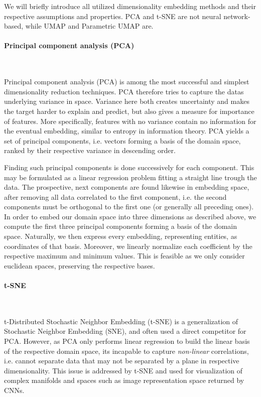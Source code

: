 \documentclass[]{article}
\renewcommand{\cite}{\citep}
\begin{document}
We will briefly introduce all utilized dimensionality embedding methods and their respective assumptions and properties. PCA and t-SNE are not neural network-based, while UMAP and Parametric UMAP are.

\paragraph{Principal component analysis (PCA)}\mbox{}\\
\label{sec:pca}


Principal component analysis (PCA) \cite{abdi2010principal, wold1987principal} is among the most successful and simplest dimensionality reduction techniques. PCA therefore tries to capture the datas underlying variance in space. Variance here both creates uncertainty and makes the target harder to explain and predict, but also gives a measure for importance of features. More specifically, features with no variance contain no information for the eventual embedding, similar to entropy in information theory. PCA yields a set of principal components, i.e. vectors forming a basis of the domain space, ranked by their respective variance in descending order. 

Finding such principal components is done successively for each component. This may be formulated as a linear regression problem fitting a straight line trough the data. The prospective, next components are found likewise in embedding space, after removing all data correlated to the first component, i.e. the second components must be orthogonal to the first one (or generally all preceding ones). In order to embed our domain space into three dimensions as described above, we compute the first three principal components forming a basis of the domain space. Naturally, we then express every embedding, representing entities, as coordinates of that basis. Moreover, we linearly normalize each coefficient by the respective maximum and minimum values. This is feasible as we only consider euclidean spaces, preserving the respective bases.

\paragraph{t-SNE}\mbox{}\\
\label{sec:tsne}

t-Distributed Stochastic Neighbor Embedding (t-SNE) \cite{van2008visualizing} is a generalization of Stochastic Neighbor Embedding (SNE), and often used a direct competitor for PCA. However, as PCA only performs linear regression to build the linear basis of the respective domain space, its incapable to capture \textit{non-linear} correlations, i.e. cannot separate data that may not be separated by a plane in respective dimensionality. This issue is addressed by t-SNE and used for visualization of complex manifolds and spaces such as image representation space returned by CNNs. \\
\end{document}
